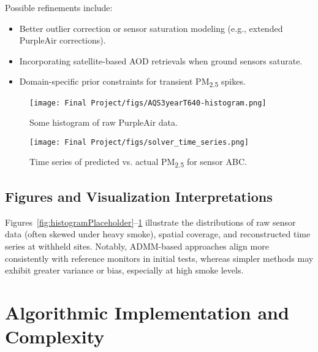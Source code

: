 \documentclass[12pt]{article}                                %
\begin{document}
Possible refinements include:
\begin{itemize}
    \item Better outlier correction or sensor saturation modeling (e.g., extended PurpleAir corrections).
    \item Incorporating satellite-based AOD retrievals when ground sensors saturate.
    \item Domain-specific prior constraints for transient PM\textsubscript{2.5} spikes.
\end{itemize}

\begin{figure}[H]
  \centering
  \begin{minipage}[b]{0.45\linewidth}
    \centering
    \texttt{[image: Final Project/figs/AQS3yearT640-histogram.png]}
    \caption{Some histogram of raw PurpleAir data.}
    \label{fig:histogramPlaceholder}
  \end{minipage}
  \quad %
  \begin{minipage}[b]{0.45\linewidth}
    \centering
    \texttt{[image: Final Project/figs/solver\_time\_series.png]}
    \caption{Time series of predicted vs. actual PM\textsubscript{2.5} for sensor ABC.}
    \label{fig:timeseriesPlaceholder}
  \end{minipage}
\end{figure}


\subsection{Figures and Visualization Interpretations}   %
Figures~\ref{fig:histogramPlaceholder}--\ref{fig:timeseriesPlaceholder} illustrate the 
distributions of raw sensor data (often skewed under heavy smoke), spatial coverage, and 
reconstructed time series at withheld sites. Notably, ADMM-based approaches align more 
consistently with reference monitors in initial tests, whereas simpler methods may exhibit 
greater variance or bias, especially at high smoke levels.

\section{Algorithmic Implementation and Complexity}
\label{sec:alg-implementation-complexity}
\end{document}
